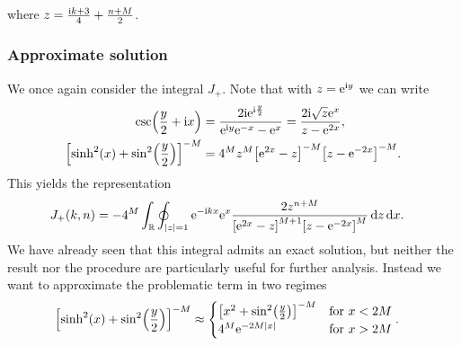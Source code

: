 \documentclass[english, parskip=full]{scrartcl}
\begin{document}
where $z = \frac{\text{i} k + 3}{4} + \frac{n+M}{2}$.
\subsubsection{Approximate solution}
We once again consider the integral $J_+$.
Note that with $z=\text{e}^{\text{i} y}$ we can write
\begin{align}
\csc\kla*{\frac{y}{2} + \i x} &= \frac{2\i \powe{\i \frac{y}{2}}}{\powe{\i y} \powe{-x} - \powe{x}} = \frac{2\i\sqrt{z} \powe{x}}{z - \powe{2x}},\\
\klb*{\sinh^2(x) + \sin^2\kla*{\frac{y}{2}}}^{-M} &= 4^M z^M \klb*{\powe{2x} - z}^{-M} \klb*{z - \powe{-2x}}^{-M}.
\end{align}
This yields the representation
\begin{align}
J_+(k,n) &= -4^M \intr{\oint_{|z|=1} \powe{-\i kx} \powe{x} \frac{2z^{n+M}}{\klb*{\powe{2x} - z}^{M+1} \klb*{z - \powe{-2x}}^{M}} \,\d z }{x}.
\end{align}
We have already seen that this integral admits an exact solution, but neither the result nor the procedure are particularly useful for further analysis.
Instead we want to approximate the problematic term in two regimes
\begin{align}
\klb*{\sinh^2(x) + \sin^2\kla*{\frac{y}{2}}}^{-M} &\approx \begin{cases} \klb*{x^2 + \sin^2\kla*{\frac{y}{2}}}^{-M} & \text{for } x<2M \\ 4^M \powe{- 2M|x|} &\text{for } x>2M \end{cases}.
\end{align}
\end{document}
